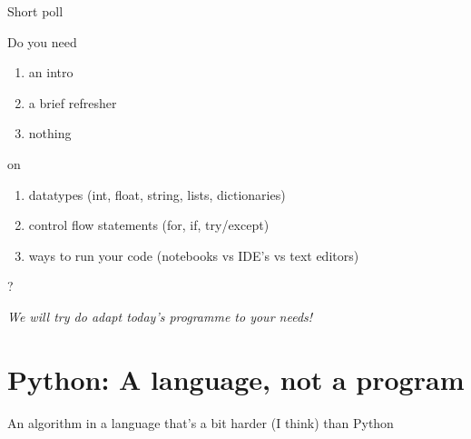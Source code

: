 \documentclass[compress]{beamer}
\begin{document}
\begin{frame}{Short poll}

Do you need
\begin{enumerate}[a]
	\item an intro
	\item a brief refresher
	\item nothing
\end{enumerate}

on

\begin{enumerate}[i]
	\item datatypes (int, float, string, lists, dictionaries)
	\item control flow statements (for, if, try/except)
	\item ways to run your code (notebooks vs IDE's vs text editors)
\end{enumerate}
?

\emph{We will try do adapt today's programme to your needs!}

\end{frame}

\section{Python: A language, not a program}


\begin{frame}[plain]
\footnotesize{An algorithm in a language that's a bit harder (I think) than Python}
\end{frame}
\end{document}

